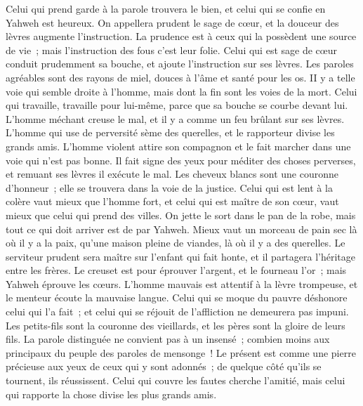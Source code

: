 \begin{multicols}{2}
Celui qui prend garde à la parole trouvera le bien, et celui qui se confie en Yahweh est heureux.
On appellera prudent le sage de cœur, et la douceur des lèvres augmente l'instruction.
La prudence est à ceux qui la possèdent une source de vie~; mais l'instruction des fous c'est leur folie.
Celui qui est sage de cœur conduit prudemment sa bouche, et ajoute l'instruction sur ses lèvres.
Les paroles agréables sont des rayons de miel, douces à l'âme et santé pour les os.
 II y a telle voie qui semble droite à l'homme, mais dont la fin sont les voies de la mort.
Celui qui travaille, travaille pour lui-même, parce que sa bouche se courbe devant lui.
L'homme méchant creuse le mal, et il y a comme un feu brûlant sur ses lèvres.
L'homme qui use de perversité sème des querelles, et le rapporteur divise les grands amis.
L'homme violent attire son compagnon et le fait marcher dans une voie qui n'est pas bonne.
Il fait signe des yeux pour méditer des choses perverses, et remuant ses lèvres il exécute le mal.
Les cheveux blancs sont une couronne d'honneur~; elle se trouvera dans la voie de la justice.
Celui qui est lent à la colère vaut mieux que l'homme fort, et celui qui est maître de son cœur, vaut mieux que celui qui prend des villes.
On jette le sort dans le pan de la robe, mais tout ce qui doit arriver est de par Yahweh.
\VerseOne{}Mieux vaut un morceau de pain sec là où il y a la paix, qu'une maison pleine de viandes, là où il y a des querelles.
Le serviteur prudent sera maître sur l'enfant qui fait honte, et il partagera l'héritage entre les frères.
Le creuset est pour éprouver l'argent, et le fourneau l'or~; mais Yahweh éprouve les cœurs.
L'homme mauvais est attentif à la lèvre trompeuse, et le menteur écoute la mauvaise langue.
Celui qui se moque du pauvre déshonore celui qui l'a fait~; et celui qui se réjouit de l'affliction ne demeurera pas impuni.
Les petits-fils sont la couronne des vieillards, et les pères sont la gloire de leurs fils.
La parole distinguée ne convient pas à un insensé~; combien moins aux principaux du peuple des paroles de mensonge~!
Le présent est comme une pierre précieuse aux yeux de ceux qui y sont adonnés~; de quelque côté qu'ils se tournent, ils réussissent.
Celui qui couvre les fautes cherche l'amitié, mais celui qui rapporte la chose divise les plus grands amis.

\end{multicols}
